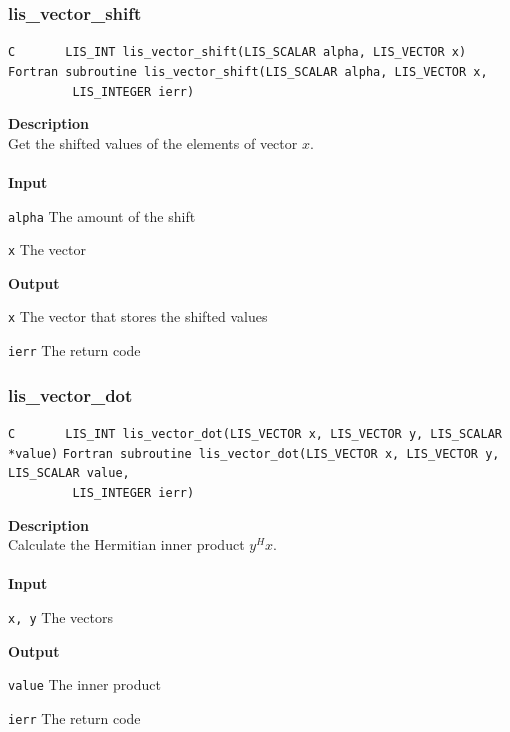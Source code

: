 \documentclass[a4paper]{article}
\newcommand{\namelistlabel}[1]{\mbox{#1}\hfill}
\newenvironment{namelist}[1]{%
\begin{list}{}
  {\let\makelabel\namelistlabel
  \settowidth{\labelwidth}{#1}
  \setlength{\leftmargin}{1.1\labelwidth}}
  }{%
\end{list}}
\begin{document}
\subsubsection{lis\_vector\_shift}
\begin{screen}
\verb|C       LIS_INT lis_vector_shift(LIS_SCALAR alpha, LIS_VECTOR x)|\\
\verb|Fortran subroutine lis_vector_shift(LIS_SCALAR alpha, LIS_VECTOR x,|\\
\verb|         LIS_INTEGER ierr)|
\end{screen}
{\bf Description}\\
\indent
Get the shifted values of the elements of vector $x$.
\\ \\
\noindent
{\bf Input}
\begin{namelist}{XXXXXXXXXXXXXXXXXXXX}
\item[\tt alpha] The amount of the shift
\item[\tt x] The vector
\end{namelist}
{\bf Output}
\begin{namelist}{XXXXXXXXXXXXXXXXXXXX}
\item[\tt x] The vector that stores the shifted values
\item[\tt ierr] The return code
\end{namelist}

\newpage
\subsubsection{lis\_vector\_dot}
\begin{screen}
\verb|C       LIS_INT lis_vector_dot(LIS_VECTOR x, LIS_VECTOR y, LIS_SCALAR *value)|
\verb|Fortran subroutine lis_vector_dot(LIS_VECTOR x, LIS_VECTOR y, LIS_SCALAR value,|\\
\verb|         LIS_INTEGER ierr)|
\end{screen}
{\bf Description}\\
\indent
Calculate the Hermitian inner product $y^{H}x$.
\\ \\
\noindent
{\bf Input}
\begin{namelist}{XXXXXXXXXXXXXXXXXXXX}
\item[\tt x, y] The vectors
\end{namelist}
{\bf Output}
\begin{namelist}{XXXXXXXXXXXXXXXXXXXX}
\item[\tt value] The inner product
\item[\tt ierr] The return code
\end{namelist}
\end{document}
